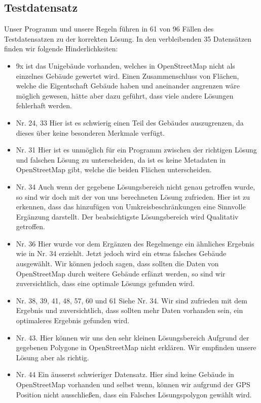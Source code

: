 \subsection{Testdatensatz}
Unser Programm und unsere Regeln führen in 61 von 96 Fällen des Testdatensatzen zu der
korrekten Lösung. In den verbleibenden 35 Datensätzen finden wir folgende Hinderlichkeiten:
\begin{itemize}
\item 9x ist das Unigebäude vorhanden, welches in OpenStreetMap nicht als einzelnes Gebäude gewertet wird.
Einen Zusammenschluss von Flächen, welche die Eigentschaft Gebäude haben und aneinander angrenzen
wäre möglich gewesen, hätte aber dazu geführt, dass viele andere Lösungen fehlerhaft werden.
\item Nr. 24, 33 Hier ist es schwierig einen Teil des Gebäudes auszugrenzen, da dieses über keine besonderen Merkmale verfügt.
\item Nr. 31 Hier ist es unmöglich für ein Programm zwischen der richtigen Lösung und falschen Lösung zu unterscheiden,
da ist es keine Metadaten in OpenStreetMap gibt, welche die beiden Flächen unterscheiden.
\item Nr. 34 Auch wenn der gegebene Lösungsbereich nicht genau getroffen wurde, so sind wir
doch mit der von uns berechneten Lösung zufrieden. Hier ist zu erkennen, dass das hinzufügen von Umkreisbeschränkungen
eine Sinnvolle Ergänzung darstellt. Der beabsichtigste Lösungsbereich wird Qualitativ getroffen.
\item Nr. 36 Hier wurde vor dem Ergänzen des Regelmenge ein ähnliches Ergebnis wie in Nr. 34 erziehlt.
Jetzt jedoch wird ein etwas falsches Gebäude ausgewählt. Wir können jedoch sagen, dass sollten
die Daten von OpenStreetMap durch weitere Gebäude erfänzt werden, so sind wir zuversichtlich, dass eine
optimale Lösungs gefunden wird.
\item Nr. 38, 39, 41, 48, 57, 60 und 61  Siehe Nr. 34. Wir sind zufrieden mit dem Ergebnis und zuversichtlich, dass
sollten mehr Daten vorhanden sein, ein optimaleres Ergebnis gefunden wird.
\item Nr. 43. Hier können wir uns den sehr kleinen Lösungsbereich Aufgrund der
gegebenen Polygone in OpenStreetMap nicht erklären. Wir empfinden unsere Lösung aber als richtig.
\item Nr. 44 Ein äusserst schwieriger Datensatz. Hier sind keine Gebäude in OpenStreetMap vorhanden
und selbst wenn, können wir aufgrund der GPS Position nicht ausschließen, dass ein
Falsches Lösungspolygon gewählt wird.

\end{itemize}
